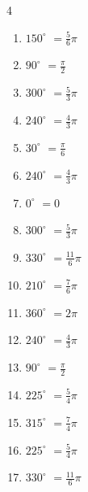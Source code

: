 \begin{multicols}{4}
\begin{enumerate}
  \item $\displaystyle 150^{\circ}$
        $\displaystyle =\frac{5}{6}\pi$

  \item $\displaystyle 90^{\circ}$
        $\displaystyle =\frac{\pi}{2}$

  \item $\displaystyle 300^{\circ}$
        $\displaystyle =\frac{5}{3}\pi$

\columnbreak %

  \item $\displaystyle 240^{\circ}$
        $\displaystyle =\frac{4}{3}\pi$

  \item $\displaystyle 30^{\circ}$
        $\displaystyle =\frac{\pi}{6}$

  \item $\displaystyle 240^{\circ}$
        $\displaystyle =\frac{4}{3}\pi$

  \item $\displaystyle 0^{\circ}$
        $\displaystyle =0$

  \item $\displaystyle 300^{\circ}$
        $\displaystyle =\frac{5}{3}\pi$

  \item $\displaystyle 330^{\circ}$
        $\displaystyle =\frac{11}{6}\pi$

  \item $\displaystyle 210^{\circ}$
        $\displaystyle =\frac{7}{6}\pi$

  \item $\displaystyle 360^{\circ}$
        $\displaystyle =2\pi$

  \item $\displaystyle 240^{\circ}$
        $\displaystyle =\frac{4}{3}\pi$

  \item $\displaystyle 90^{\circ}$
        $\displaystyle =\frac{\pi}{2}$

  \item $\displaystyle 225^{\circ}$
        $\displaystyle =\frac{5}{4}\pi$

  \item $\displaystyle 315^{\circ}$
        $\displaystyle =\frac{7}{4}\pi$

  \item $\displaystyle 225^{\circ}$
        $\displaystyle =\frac{5}{4}\pi$

  \item $\displaystyle 330^{\circ}$
        $\displaystyle =\frac{11}{6}\pi$


\end{enumerate}
\end{multicols}
